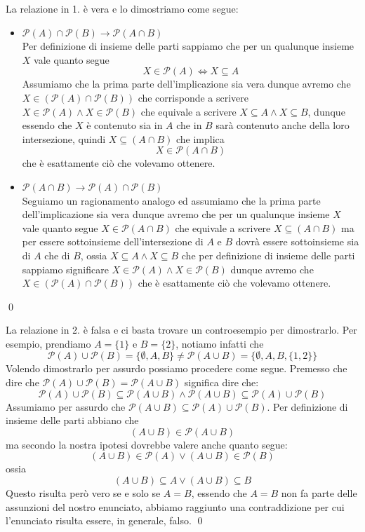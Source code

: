 \begin{soluzione}
La relazione in 1. è vera e lo dimostriamo come segue:
\begin{itemize}
\item[$\Rightarrow$] $\mathcal{P}(A) \cap \mathcal{P}(B) \rightarrow \mathcal{P}(A\cap B)$\\
Per definizione di insieme delle parti sappiamo che per un qualunque insieme $X$ vale quanto segue $$X\in\mathcal{P}(A) \Leftrightarrow X\subseteq A$$
Assumiamo che la prima parte dell'implicazione sia vera dunque avremo che $X\in(\mathcal{P}(A)\cap\mathcal{P}(B))$ che corrisponde a scrivere $X\in\mathcal{P}(A)\wedge X\in\mathcal{P}(B)$ che equivale a scrivere $X\subseteq A\wedge X\subseteq B$, dunque essendo che $X$ è contenuto sia in $A$ che in $B$ sarà contenuto anche della loro intersezione, quindi $X\subseteq (A\cap B)$ che implica $$X\in\mathcal{P}(A\cap B)$$ che è esattamente ciò che volevamo ottenere.

\item[$\Leftarrow$] $\mathcal{P}(A\cap B) \rightarrow \mathcal{P}(A) \cap \mathcal{P}(B)$\\
Seguiamo un ragionamento analogo ed assumiamo che la prima parte dell'implicazione sia vera dunque avremo che per un qualunque insieme $X$ vale quanto segue $X\in\mathcal{P}(A\cap B)$ che equivale a scrivere $X\subseteq (A\cap B)$ ma per essere sottoinsieme dell'intersezione di $A$ e $B$ dovrà essere sottoinsieme sia di $A$ che di $B$, ossia $X\subseteq A\wedge X\subseteq B$ che per definizione di insieme delle parti sappiamo significare $X\in\mathcal{P}(A)\wedge X\in\mathcal{P}(B)$ dunque avremo che $X\in(\mathcal{P}(A)\cap \mathcal{P}(B))$ che è esattamente ciò che volevamo ottenere.
\end{itemize}
\qed
\bigskip

\noindent La relazione in 2. è falsa e ci basta trovare un controesempio per dimostrarlo. Per esempio, prendiamo $A=\{1\}$ e $B=\{2\}$, notiamo infatti che 
$$\mathcal{P}(A)\cup\mathcal{P}(B) = \{\emptyset, A, B\} \neq \mathcal{P}(A\cup B) = \{\emptyset, A, B, \{1,2\} \}$$
Volendo dimostrarlo per assurdo possiamo procedere come segue. Premesso che dire che $\mathcal{P}(A)\cup \mathcal{P}(B)=\mathcal{P}(A\cup B)$ significa dire che: 
$$\mathcal{P}(A)\cup \mathcal{P}(B)\subseteq \mathcal{P}(A\cup B) \wedge \mathcal{P}(A\cup B)\subseteq  \mathcal{P}(A)\cup \mathcal{P}(B)$$
Assumiamo per assurdo che $\mathcal{P}(A\cup B)\subseteq  \mathcal{P}(A)\cup \mathcal{P}(B)$. 
Per definizione di insieme delle parti abbiano che $$(A\cup B) \in \mathcal{P}(A\cup B)$$ ma secondo la nostra ipotesi dovrebbe valere anche quanto segue: 
$$(A\cup B)\in\mathcal{P}(A) \vee (A\cup B)\in\mathcal{P}(B)$$
ossia
$$(A\cup B)\subseteq A \vee (A\cup B)\subseteq B$$
Questo risulta però vero se e solo se $A=B$, essendo che $A=B$ non fa parte delle assunzioni del nostro enunciato, abbiamo raggiunto una contraddizione per cui l'enunciato risulta essere, in generale, falso. \qed\\
\end{soluzione}

